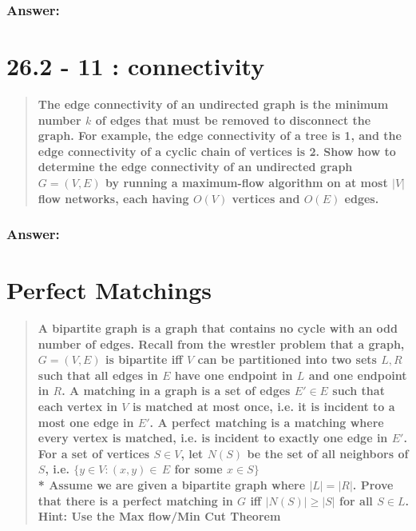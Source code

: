 \documentclass[titlepage]{article}\usepackage[]{graphicx}\usepackage[]{color}
\begin{document}
  \subsubsection{Answer:}

  \vspace{9cm}


\section{26.2 - 11 : connectivity}
  \begin{quote}
    \textbf{The edge connectivity of an undirected graph is the minimum number
      $k$ of edges that must be removed to disconnect the graph. For example,
      the edge connectivity of a tree is 1, and the edge connectivity of a
      cyclic chain of vertices is 2. Show how to determine the edge
      connectivity of an undirected graph $G = (V,E) $ by running a
      maximum-flow algorithm on at most $|V|$ flow networks, each having $O(V)$
      vertices and $O(E)$ edges.}
  \end{quote}

  \subsubsection{Answer:}
  \vspace{9cm}


\section{Perfect Matchings}
  \begin{quote}
      \textbf{A bipartite graph is a graph that contains no cycle with an odd
      number of edges. Recall from the wrestler problem that a graph, $G = (V,
      E)$ is
    bipartite iff $V$ can be partitioned into two sets $L, R$ such that all
    edges in $E$
    have one endpoint in $L$ and one endpoint in $R$. A matching in a graph is a set of
    edges $E' \in E$ such that each vertex in $V$ is matched at most once, i.e. it is
    incident to a most one edge in $E'$. A perfect matching is a matching where every
    vertex is matched, i.e. is incident to exactly one edge in $E'$. For a set of
    vertices $S \in V$, let $N(S)$ be the set of all neighbors of $S$, i.e. $\{y
    \in V : (x,y) \in \, E $ for some $x \in S\}$ \\*
    Assume we are given a bipartite graph where $|L| = |R|$. Prove that there is a
    perfect matching in $G$ iff $|N(S)| \geq |S|$ for all $S \in L$.
    Hint: Use the Max flow/Min Cut Theorem}
  \end{quote}
\end{document}
